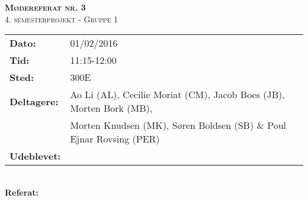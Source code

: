 
\newcommand{\HRule}{\rule{\linewidth}{0.1mm}}


	\begin{center}
		{\huge \bfseries \textsc{Mødereferat nr. 3}}\\
		\textsc{\large 4. semesterprojekt - Gruppe 1}\\[0.3cm]
	\end{center}
	\begin{tabular}{ll}
	\large \textbf{Dato:} & 01/02/2016  	\\ %
	\large \textbf{Tid:}  & 11:15-12:00 	\\ %
	\large \textbf{Sted:} & 300E		\\ %
	\large \textbf{Deltagere:} & Ao Li (AL), Cecilie Moriat (CM), Jacob Boes (JB), Morten Bork (MB),\\
	\large \textbf & Morten Knudsen (MK), Søren Boldsen (SB) \& Poul Ejnar Rovsing (PER)\\
	\large \textbf{Udeblevet:}
	\end{tabular}\\
	\phantom{\,}\hspace{0.1em} \large \textbf{Referat:}
